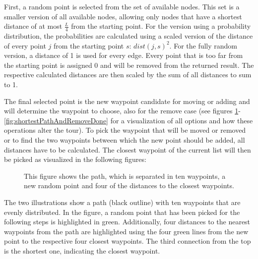 First, a random point is selected from the set of available nodes.
This set is a smaller version of all available nodes, allowing only nodes that have a shortest distance of at most $\frac{L}{4}$ from the starting point. 
For the version using a probability distribution, the probabilities are calculated using a scaled version of the distance of every point $j$ from the starting point $s$: $dist(j,s)^2$.
For the fully random version, a distance of 1 is used for every edge.
Every point that is too far from the starting point is assigned 0 and will be removed from the returned result.
The respective calculated distances are then scaled by the sum of all distances to sum to 1.

The final selected point is the new waypoint candidate for moving or adding and will determine the waypoint to choose, also for the remove case (see figures \ref{fig:tour_picked_waypoint_shortest_paths}-\ref{fig:shortestPathAndRemoveDone} for a visualization of all options and how these operations alter the tour).
To pick the waypoint that will be moved or removed or to find the two waypoints between which the new point should be added, all distances have to be calculated.
The closest waypoint of the current list will then be picked as visualized in the following figures:
%
%		
	\begin{figure}[H]
		\centering
		
		\caption{This figure shows the path, which is separated in ten waypoints, a new random point and four of the distances to the closest waypoints.}
		\label{fig:tour_picked_waypoint_shortest_paths}
	\end{figure}

The two illustrations show a path (black outline) with ten waypoints that are evenly distributed.
In the figure, a random point that has been picked for the following steps is highlighted in green.
Additionally, four distances to the nearest waypoints from the path are highlighted using the four green lines from the new point to the respective four closest waypoints.
The third connection from the top is the shortest one, indicating the closest waypoint.

